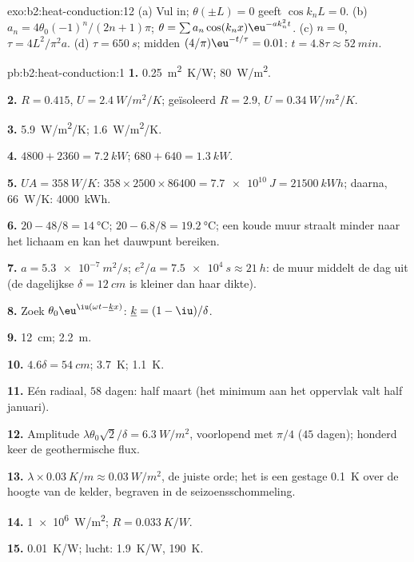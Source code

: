 \begin{solution}{exo:b2:heat-conduction:12}
(a) Vul in; $\theta(\pm L) = 0$ geeft $\cos k_nL = 0$. (b)
$a_n =
4\theta_0(-1)^n/(2n+1)\pi$;
$\theta = \sum a_n\cos(k_nx)\eu^{-ak_n^2t}$. (c) $n = 0$,
$\tau = 4L^2/\pi^2a$. (d) $\tau = \qty{650}{s}$; midden
$(4/\pi)\eu^{-t/\tau} = 0.01$:
$t = 4.8\tau \approx \qty{52}{min}$.
\end{solution}

\begin{solution}{pb:b2:heat-conduction:1}
\textbf{1.} \qty{0.25}{m^2.K/W}; \qty{80}{W/m^2}.

\textbf{2.} $R = 0.415$, $U = \qty{2.4}{W/m^2/K}$; geïsoleerd $R = 2.9$,
$U =
\qty{0.34}{W/m^2/K}$.

\textbf{3.} \qty{5.9}{W/m^2/K}; \qty{1.6}{W/m^2/K}.

\textbf{4.} $4800 + 2360 = \qty{7.2}{kW}$; $680 + 640 = \qty{1.3}{kW}$.

\textbf{5.} $UA = \qty{358}{W/K}$:
$358 \times 2500 \times 86400 = \qty{7.7e10}{J} =
\qty{21500}{kWh}$; daarna,
\qty{66}{W/K}: \qty{4000}{kWh}.

\textbf{6.} $20 - 48/8 = \qty{14}{\celsius}$; $20 - 6.8/8 = \qty{19.2}{\celsius}$;
een koude muur straalt minder naar het lichaam en kan het dauwpunt bereiken.

\textbf{7.} $a = \qty{5.3e-7}{m^2/s}$;
$e^2/a = \qty{7.5e4}{s} \approx \qty{21}{h}$: de
muur middelt de dag uit (de dagelijkse $\delta = \qty{12}{cm}$ is kleiner dan
haar dikte).

\textbf{8.} Zoek $\theta_0\eu^{\iu(\omega t - \underline kx)}$:
$\underline k = (1 - \iu)/\delta$.

\textbf{9.} \qty{12}{cm}; \qty{2.2}{m}.

\textbf{10.} $4.6\delta = \qty{54}{cm}$; \qty{3.7}{K}; \qty{1.1}{K}.

\textbf{11.} Eén radiaal, $58$ dagen: half maart (het minimum aan het oppervlak
valt half januari).

\textbf{12.} Amplitude $\lambda\theta_0\sqrt2/\delta = \qty{6.3}{W/m^2}$,
voorlopend met
$\pi/4$ ($45$ dagen); honderd keer de geothermische flux.

\textbf{13.} $\lambda \times \qty{0.03}{K/m} \approx \qty{0.03}{W/m^2}$, de
juiste orde; het
is een gestage \qty{0.1}{K} over de hoogte van de kelder, begraven in de
seizoensschommeling.

\textbf{14.} \qty{1e6}{W/m^2}; $R = \qty{0.033}{K/W}$.

\textbf{15.} \qty{0.01}{K/W}; lucht: \qty{1.9}{K/W}, \qty{190}{K}.


\end{solution}
